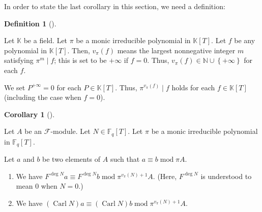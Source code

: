 \documentclass[numbers=enddot,12pt,final,onecolumn,notitlepage]{scrartcl}%
\theoremstyle{definition}
\newtheorem{defi}[theo]{Definition}
\newenvironment{definition}[1][]
{\begin{defi}[#1]\begin{leftbar}}
{\end{leftbar}\end{defi}}
\newtheorem{coro}[theo]{Corollary}
\newenvironment{corollary}[1][]
{\begin{coro}[#1]\begin{leftbar}}
{\end{leftbar}\end{coro}}
\begin{document}
In order to state the last corollary in this section, we need a definition:

\begin{definition}
\label{def.vpi}Let $\mathbb{K}$ be a field. Let $\pi$ be a monic irreducible
polynomial in $\mathbb{K}\left[  T\right]  $. Let $f$ be any polynomial in
$\mathbb{K}\left[  T\right]  $. Then, $v_{\pi}\left(  f\right)  $ means the
largest nonnegative integer $m$ satisfying $\pi^{m}\mid f$; this is set to be
$+\infty$ if $f=0$. Thus, $v_{\pi}\left(  f\right)  \in\mathbb{N}\cup\left\{
+\infty\right\}  $ for each $f$.

We set $P^{+\infty}=0$ for each $P\in\mathbb{K}\left[  T\right]  $. Thus,
$\pi^{v_{\pi}\left(  f\right)  }\mid f$ holds for each $f\in\mathbb{K}\left[
T\right]  $ (including the case when $f=0$).
\end{definition}

\begin{corollary}
\label{cor.F.lift.lift-all}Let $A$ be an $\mathcal{F}$-module. Let
$N\in\mathbb{F}_{q}\left[  T\right]  $. Let $\pi$ be a monic irreducible
polynomial in $\mathbb{F}_{q}\left[  T\right]  $.

Let $a$ and $b$ be two elements of $A$ such that $a\equiv b\operatorname{mod}%
\pi A$.

\begin{enumerate}
\item[\textbf{(a)}] We have $F^{\deg N}a\equiv F^{\deg N}b\operatorname{mod}%
\pi^{v_{\pi}\left(  N\right)  +1}A$. (Here, $F^{\deg N}$ is understood to mean
$0$ when $N=0$.)

\item[\textbf{(b)}] We have $\left(  \operatorname*{Carl}N\right)
a\equiv\left(  \operatorname*{Carl}N\right)  b\operatorname{mod}\pi^{v_{\pi
}\left(  N\right)  +1}A$.
\end{enumerate}
\end{corollary}
\end{document}
